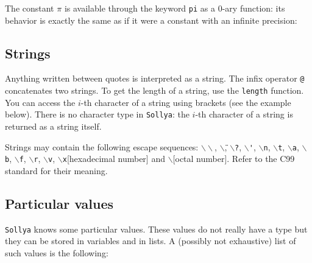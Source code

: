 \documentclass[a4paper]{article}
\newcommand{\com}[1]{\texttt{#1}}
\newcommand{\key}[1]{\texttt{#1}}
\newcommand{\sollya}{\texttt{Sollya}\xspace}
\begin{document}
The constant $\pi$ is available through the keyword \key{pi} as a $0$-ary function: its behavior is exactly the same as if it were a constant with an infinite precision:



\subsection{Strings}
Anything written between quotes is interpreted as a string. The infix operator \com{@} concatenates two strings. To get the length of a string, use the \com{length} function. You can access the $i$-th character of a string using brackets (see the example below). There is no character type in \sollya: the $i$-th character of a string is returned as a string itself.



Strings may contain the following escape sequences:
\texttt{$\backslash\backslash$}, \texttt{$\backslash$\"},
\texttt{$\backslash$?}, \texttt{$\backslash$\'},
\texttt{$\backslash$n}, \texttt{$\backslash$t},
\texttt{$\backslash$a}, \texttt{$\backslash$b},
\texttt{$\backslash$f}, \texttt{$\backslash$r},
\texttt{$\backslash$v}, \texttt{$\backslash$x}[hexadecimal number] and
\texttt{$\backslash$}[octal number]. Refer to the C99 standard for their
meaning.

\subsection{Particular values}
\sollya knows some particular values. These values do not really have a type but they can be stored in variables and in lists. A (possibly not exhaustive) list of such values is the following:
\end{document}

